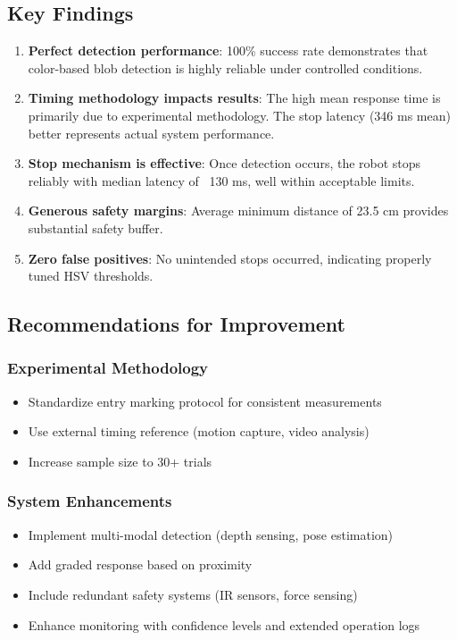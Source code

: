 \documentclass[11pt,letterpaper]{article}
\begin{document}
\subsection{Key Findings}

\begin{enumerate}[leftmargin=*]
    \item \textbf{Perfect detection performance}: 100\% success rate demonstrates that color-based blob detection is highly reliable under controlled conditions.

    \item \textbf{Timing methodology impacts results}: The high mean response time is primarily due to experimental methodology. The stop latency (346 ms mean) better represents actual system performance.

    \item \textbf{Stop mechanism is effective}: Once detection occurs, the robot stops reliably with median latency of ~130 ms, well within acceptable limits.

    \item \textbf{Generous safety margins}: Average minimum distance of 23.5 cm provides substantial safety buffer.

    \item \textbf{Zero false positives}: No unintended stops occurred, indicating properly tuned HSV thresholds.
\end{enumerate}

\subsection{Recommendations for Improvement}

\subsubsection{Experimental Methodology}
\begin{itemize}[leftmargin=*]
    \item Standardize entry marking protocol for consistent measurements
    \item Use external timing reference (motion capture, video analysis)
    \item Increase sample size to 30+ trials
\end{itemize}

\subsubsection{System Enhancements}
\begin{itemize}[leftmargin=*]
    \item Implement multi-modal detection (depth sensing, pose estimation)
    \item Add graded response based on proximity
    \item Include redundant safety systems (IR sensors, force sensing)
    \item Enhance monitoring with confidence levels and extended operation logs
\end{itemize}
\end{document}
